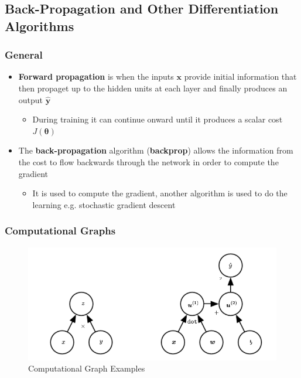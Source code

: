 \documentclass[11pt]{article}
\begin{document}
\subsection{Back-Propagation and Other Differentiation Algorithms}
\label{sec:org1097e2b}
\subsubsection{General}
\label{sec:orgfd78d2b}
\begin{itemize}
\item \textbf{Forward propagation} is when the inputs \(\pmb x\) provide initial information that then propaget up to the hidden units at each layer and finally produces an output \(\hat{\pmb y}\)
\begin{itemize}
\item During training it can continue onward until it produces a scalar cost \(J(\pmb \theta)\)
\end{itemize}

\item The \textbf{back-propagation} algorithm (\textbf{backprop}) allows the information from the cost to flow backwards through the network in order to compute the gradient
\begin{itemize}
\item It is used to compute the gradient, another algorithm is used to do the learning e.g. stochastic gradient descent
\end{itemize}
\end{itemize}

\subsubsection{Computational Graphs}
\label{sec:org17ea0d8}
\begin{figure}[htbp]
\centering
\includegraphics[width=.9\linewidth]{Deep Feedforward Networks/screenshot_2018-10-01_17-49-44.png}
\caption{\label{fig:orgb08084f}
Computational Graph Examples}
\end{figure}
\end{document}
